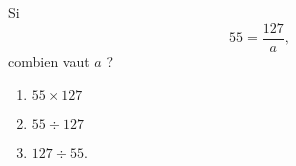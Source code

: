 
\begin{mental}
    Si 
    \begin{equation}
        55=\frac{ 127 }{ a },
    \end{equation}
    combien vaut \( a\) ?
    \begin{enumerate}
        \item
            \( 55\times 127\)
        \item
            \( 55\div 127\)
        \item
            \( 127\div 55\).
    \end{enumerate}
\end{mental}
